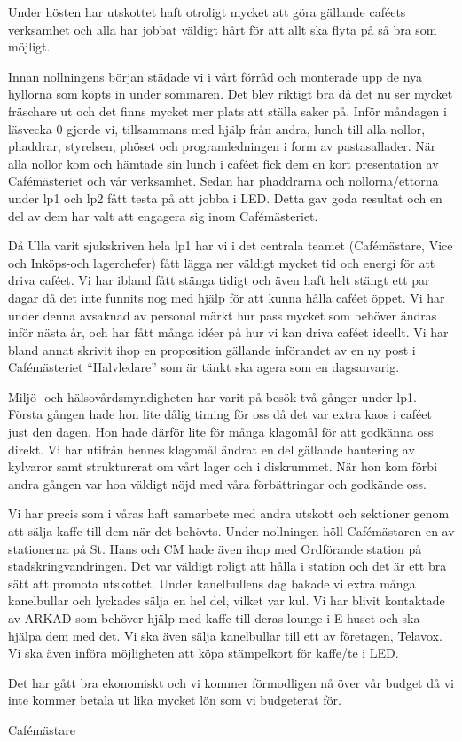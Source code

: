\documentclass[../_main/handlingar.tex]{subfiles}
\begin{document}
Under hösten har utskottet haft otroligt mycket att göra gällande caféets verksamhet och alla har jobbat väldigt hårt för att allt ska flyta på så bra som möjligt.

Innan nollningens början städade vi i vårt förråd och monterade upp de nya hyllorna som köpts in under sommaren. Det blev riktigt bra då det nu ser mycket fräschare ut och det finns mycket mer plats att ställa saker på. Inför måndagen i läsvecka 0 gjorde vi, tillsammans med hjälp från andra, lunch till alla nollor, phaddrar, styrelsen, phöset och programledningen i form av pastasallader. När alla nollor kom och hämtade sin lunch i caféet fick dem en kort presentation av Cafémästeriet och vår verksamhet. Sedan har phaddrarna och nollorna/ettorna under lp1 och lp2 fått testa på att jobba i LED. Detta gav goda resultat och en del av dem har valt att engagera sig inom Cafémästeriet.

Då Ulla varit sjukskriven hela lp1 har vi i det centrala teamet (Cafémästare, Vice och Inköps-och lagerchefer) fått lägga ner väldigt mycket tid och energi för att driva caféet. Vi har ibland fått stänga tidigt och även haft helt stängt ett par dagar då det inte funnits nog med hjälp för att kunna hålla caféet öppet. Vi har under denna avsaknad av personal märkt hur pass mycket som behöver ändras inför nästa år, och har fått många idéer på hur vi kan driva caféet ideellt. Vi har bland annat skrivit ihop en proposition gällande införandet av en ny post i Cafémästeriet ``Halvledare'' som är tänkt ska agera som en dagsanvarig.

Miljö- och hälsovårdsmyndigheten har varit på besök två gånger under lp1. Första gången hade hon lite dålig timing för oss då det var extra kaos i caféet just den dagen. Hon hade därför lite för många klagomål för att godkänna oss direkt. Vi har utifrån hennes klagomål ändrat en del gällande hantering av kylvaror samt strukturerat om vårt lager och i diskrummet. När hon kom förbi andra gången var hon väldigt nöjd med våra förbättringar och godkände oss.

Vi har precis som i våras haft samarbete med andra utskott och sektioner genom att sälja kaffe till dem när det behövts. Under nollningen höll Cafémästaren en av stationerna på St. Hans och CM hade även ihop med Ordförande station på stadskringvandringen. Det var väldigt roligt att hålla i station och det är ett bra sätt att promota utskottet. Under kanelbullens dag bakade vi extra många kanelbullar och lyckades sälja en hel del, vilket var kul. Vi har blivit kontaktade av ARKAD som behöver hjälp med kaffe till deras lounge i E-huset och ska hjälpa dem med det. Vi ska även sälja kanelbullar till ett av företagen, Telavox. Vi ska även införa möjligheten att köpa stämpelkort för kaffe/te i LED.

Det har gått bra ekonomiskt och vi kommer förmodligen nå över vår budget då vi inte kommer betala ut lika mycket lön som vi budgeterat för.

\begin{signatures}{1}
    \mvh
    \signature{Daniel Bakic}{Cafémästare}
\end{signatures}
\end{document}
